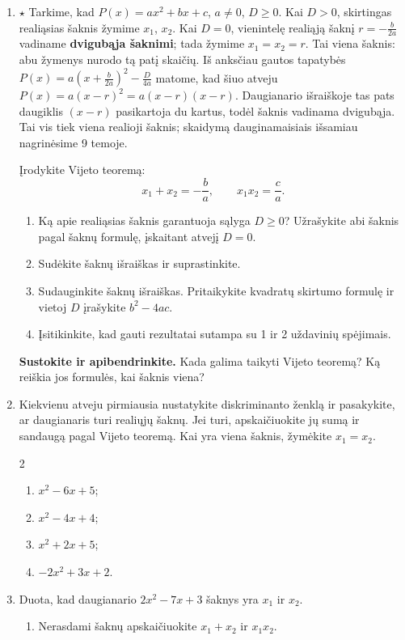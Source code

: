 \documentclass[12pt,a4paper]{article}
\begin{document}
\begin{enumerate}[series=uzdaviniai]
\begin{enumerate}
\end{enumerate}
\needspace{9cm}
\item $\star$ Tarkime, kad $P(x)=ax^2+bx+c$, $a\ne0$, $D\geq0$. Kai $D>0$, skirtingas realiąsias šaknis žymime $x_1$, $x_2$. Kai $D=0$, vienintelę realiąją šaknį $r=-\frac{b}{2a}$ vadiname \textbf{dvigubąja šaknimi}; tada žymime $x_1=x_2=r$. Tai viena šaknis: abu žymenys nurodo tą patį skaičių. Iš anksčiau gautos tapatybės $P(x)=a\left(x+\frac{b}{2a}\right)^2-\frac{D}{4a}$ matome, kad šiuo atveju $P(x)=a(x-r)^2=a(x-r)(x-r)$. Daugianario išraiškoje tas pats daugiklis $(x-r)$ pasikartoja du kartus, todėl šaknis vadinama dvigubąja. Tai vis tiek viena realioji šaknis; skaidymą dauginamaisiais išsamiau nagrinėsime 9 temoje.

Įrodykite Vijeto teoremą:
\[x_1+x_2=-\frac{b}{a},\qquad x_1x_2=\frac{c}{a}.\]
\begin{enumerate}
\item Ką apie realiąsias šaknis garantuoja sąlyga $D\geq0$? Užrašykite abi šaknis pagal šaknų formulę, įskaitant atvejį $D=0$.
\item Sudėkite šaknų išraiškas ir suprastinkite.
\item Sudauginkite šaknų išraiškas. Pritaikykite kvadratų skirtumo formulę ir vietoj $D$ įrašykite $b^2-4ac$.
\item Įsitikinkite, kad gauti rezultatai sutampa su 1 ir 2 uždavinių spėjimais.
\end{enumerate}
\textbf{Sustokite ir apibendrinkite.} Kada galima taikyti Vijeto teoremą? Ką reiškia jos formulės, kai šaknis viena?
\needspace{4cm}
\item Kiekvienu atveju pirmiausia nustatykite diskriminanto ženklą ir pasakykite, ar daugianaris turi realiųjų šaknų. Jei turi, apskaičiuokite jų sumą ir sandaugą pagal Vijeto teoremą. Kai yra viena šaknis, žymėkite $x_1=x_2$.
\begin{multicols}{2}\begin{enumerate}
\item $x^2-6x+5$; \item $x^2-4x+4$; \item $x^2+2x+5$; \item $-2x^2+3x+2$.
\end{enumerate}\end{multicols}
\item Duota, kad daugianario $2x^2-7x+3$ šaknys yra $x_1$ ir $x_2$.
\begin{enumerate}
\item Nerasdami šaknų apskaičiuokite $x_1+x_2$ ir $x_1x_2$.

\end{enumerate}
\end{enumerate}
\end{document}
